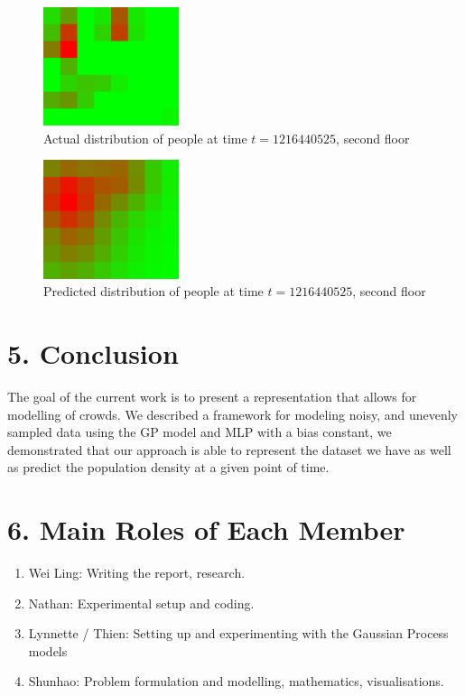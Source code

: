\documentclass[letterpaper]{article}
\begin{document}
\begin{figure}[h!]
  \centering
    \includegraphics[width=150px,natwidth=320,natheight=280]{selected_renders/1_1216440525.png}
  \caption{Actual distribution of people at time $t=1216440525$, second floor}
  \label{fig:t3dist}
\end{figure}

\begin{figure}[h!]
  \centering
    \includegraphics[width=150px,natwidth=320,natheight=280]{selected_renders/1_1216440525p.png}
  \caption{Predicted distribution of people at time $t=1216440525$, second floor}
  \label{fig:t4dist}
\end{figure}


\section{5.  Conclusion}

The goal of the current work is to present a representation that allows for modelling of crowds. We described a framework for modeling noisy, and unevenly sampled
data using the GP model and MLP with a bias constant, we demonstrated that our approach is able to represent the dataset we have as well as predict the population density at a given point of time.

\section{6. Main Roles of Each Member}
\begin{enumerate}
\item Wei Ling: Writing the report, research.
\item Nathan: Experimental setup and coding.
\item Lynnette / Thien: Setting up and experimenting with the Gaussian Process models
\item Shunhao: Problem formulation and modelling, mathematics, visualisations.
\end{enumerate}
\end{document}
